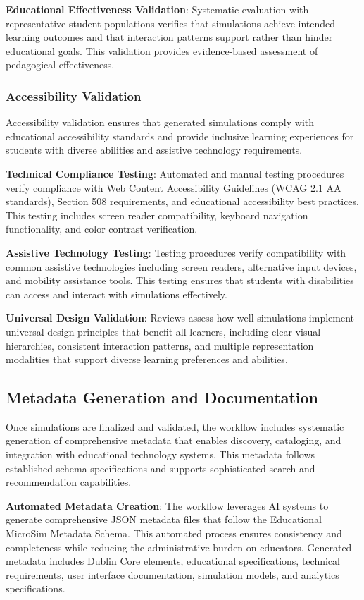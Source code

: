 \textbf{Educational Effectiveness Validation}: Systematic evaluation with representative student populations verifies that simulations achieve intended learning outcomes and that interaction patterns support rather than hinder educational goals. This validation provides evidence-based assessment of pedagogical effectiveness.

\subsubsection{Accessibility Validation}

Accessibility validation ensures that generated simulations comply with educational accessibility standards and provide inclusive learning experiences for students with diverse abilities and assistive technology requirements.

\textbf{Technical Compliance Testing}: Automated and manual testing procedures verify compliance with Web Content Accessibility Guidelines (WCAG 2.1 AA standards), Section 508 requirements, and educational accessibility best practices. This testing includes screen reader compatibility, keyboard navigation functionality, and color contrast verification.

\textbf{Assistive Technology Testing}: Testing procedures verify compatibility with common assistive technologies including screen readers, alternative input devices, and mobility assistance tools. This testing ensures that students with disabilities can access and interact with simulations effectively.

\textbf{Universal Design Validation}: Reviews assess how well simulations implement universal design principles that benefit all learners, including clear visual hierarchies, consistent interaction patterns, and multiple representation modalities that support diverse learning preferences and abilities.

\subsection{Metadata Generation and Documentation}

Once simulations are finalized and validated, the workflow includes systematic generation of comprehensive metadata that enables discovery, cataloging, and integration with educational technology systems. This metadata follows established schema specifications and supports sophisticated search and recommendation capabilities.

\textbf{Automated Metadata Creation}: The workflow leverages AI systems to generate comprehensive JSON metadata files that follow the Educational MicroSim Metadata Schema. This automated process ensures consistency and completeness while reducing the administrative burden on educators. Generated metadata includes Dublin Core elements, educational specifications, technical requirements, user interface documentation, simulation models, and analytics specifications.

